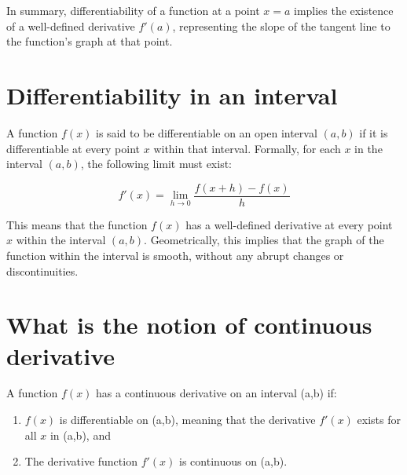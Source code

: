In summary, differentiability of a function at a point \( x = a \) implies the existence of a well-defined derivative \( f'(a) \), representing the slope of the tangent line to the function's graph at that point.




\section{Differentiability in an interval}

A function \( f(x) \) is said to be differentiable on an open interval \( (a, b) \) if it is differentiable at every point \( x \) within that interval. Formally, for each \( x \) in the interval \( (a, b) \), the following limit must exist:

\[
f'(x) = \lim_{h \to 0} \frac{f(x + h) - f(x)}{h}
\]

This means that the function \( f(x) \) has a well-defined derivative at every point \( x \) within the interval \( (a, b) \). Geometrically, this implies that the graph of the function within the interval is smooth, without any abrupt changes or discontinuities.


\section{What is the notion of continuous derivative}

A function \( f(x) \) has a continuous derivative on an interval (a,b) if:

\begin{enumerate}
    \item \( f(x) \) is differentiable on (a,b), meaning that the derivative \( f'(x) \) exists for all \( x \) in (a,b), and
    \item The derivative function \( f'(x) \) is continuous on (a,b).
\end{enumerate}

